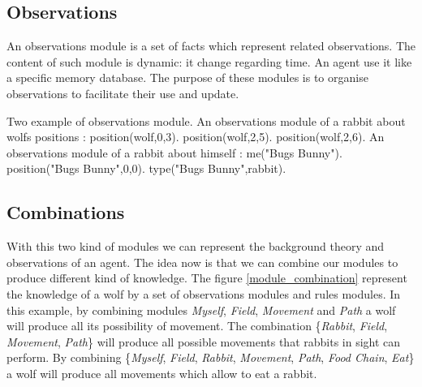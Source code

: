 \documentclass{aamas2012}
\begin{document}
\subsection{Observations}

	\begin{definition}
		An observations module is a set of facts which represent related observations.
		The content of such module is dynamic: it change regarding time.
		An agent use it like a specific memory database.
		The purpose of these modules is to organise observations to facilitate their use and update.
	\end{definition}
	
	\begin{example}
		Two example of observations module.
		\newline
		An observations module of a rabbit about wolfs positions :\newline
		\newline
		position(wolf,0,3).\newline
		position(wolf,2,5).\newline
		position(wolf,2,6).\newline
		\newline
		An observations module of a rabbit about himself : \newline
		\newline
		me("Bugs Bunny").\newline
		position("Bugs Bunny",0,0).\newline
		type("Bugs Bunny",rabbit).\newline
	\end{example}
	
\subsection{Combinations}

	With this two kind of modules we can represent the background theory and observations of an agent.
	The idea now is that we can combine our modules to produce different kind of knowledge.
	The figure \ref{module_combination} represent the knowledge of a wolf by a set of observations modules and rules modules.
	In this example, by combining modules \emph{Myself}, \emph{Field}, \emph{Movement} and \emph{Path} 
	a wolf will produce all its possibility of movement.
	The combination \{\emph{Rabbit}, \emph{Field}, \emph{Movement}, \emph{Path}\} will produce all possible movements that rabbits in sight can perform. 
	By combining \{\emph{Myself}, \emph{Field}, \emph{Rabbit}, \emph{Movement}, \emph{Path}, \emph{Food Chain}, \emph{Eat}\} a wolf will produce
	all movements which allow to eat a rabbit.
	
\end{document}
